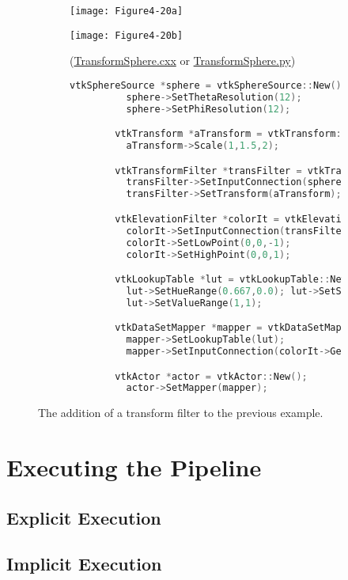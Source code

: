 \begin{figure}[htb]
	\begin{subfigure}[h]{0.48\linewidth}
		\texttt{[image: Figure4-20a]}
		\caption*{}
		\label{fig:Figure4-20a}
	\end{subfigure}
	\hfill
	\begin{subfigure}[h]{0.48\linewidth}
		\texttt{[image: Figure4-20b]}
		\caption*{(\href{https://lorensen.github.io/VTKExamples/site/Cxx/Rendering/TransformSphere/}{TransformSphere.cxx} or \href{https://lorensen.github.io/VTKExamples/site/Python/Rendering/TransformSphere/}{TransformSphere.py})}
		\label{fig:Figure4-20b}
	\end{subfigure}
	\hfill
	\begin{subfigure}[h]{0.96\linewidth}
		\caption*{}
	\end{subfigure}
	\hfill
	\begin{subfigure}[h]{0.96\linewidth}
		\begin{lstlisting}[language=C++, caption={Warped Sphere.}]
		vtkSphereSource *sphere = vtkSphereSource::New();
		  sphere->SetThetaResolution(12);
		  sphere->SetPhiResolution(12);

		vtkTransform *aTransform = vtkTransform::New();
		  aTransform->Scale(1,1.5,2);

		vtkTransformFilter *transFilter = vtkTransformFilter::New();
		  transFilter->SetInputConnection(sphere->GetOutputPort());
		  transFilter->SetTransform(aTransform);

		vtkElevationFilter *colorIt = vtkElevationFilter::New();
		  colorIt->SetInputConnection(transFilter->GetOutputPort());
		  colorIt->SetLowPoint(0,0,-1);
		  colorIt->SetHighPoint(0,0,1);

		vtkLookupTable *lut = vtkLookupTable::New();
		  lut->SetHueRange(0.667,0.0); lut->SetSaturationRange(1,1);
		  lut->SetValueRange(1,1);

		vtkDataSetMapper *mapper = vtkDataSetMapper::New();
		  mapper->SetLookupTable(lut);
		  mapper->SetInputConnection(colorIt->GetOutputPort());

		vtkActor *actor = vtkActor::New();
		  actor->SetMapper(mapper);
		\end{lstlisting}
		\caption*{}
		\label{fig:Figure4-20c}
	\end{subfigure}
	\caption{The addition of a transform filter to the previous
		example.}\label{fig:Figure4-20}
\end{figure}

\section{Executing the Pipeline}

\subsection{Explicit Execution}

\subsection{Implicit Execution}
\label{subsec:implicit_execution}